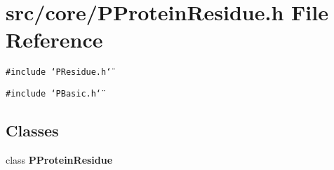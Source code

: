 \section{src/core/PProtein\-Residue.h File Reference}
\label{PProteinResidue_8h}


{\tt \#include \char`\"{}PResidue.h\char`\"{}}\par
{\tt \#include \char`\"{}PBasic.h\char`\"{}}\par
\subsection*{Classes}
\begin{CompactItemize}
\item 
class {\bf PProtein\-Residue}
\end{CompactItemize}
